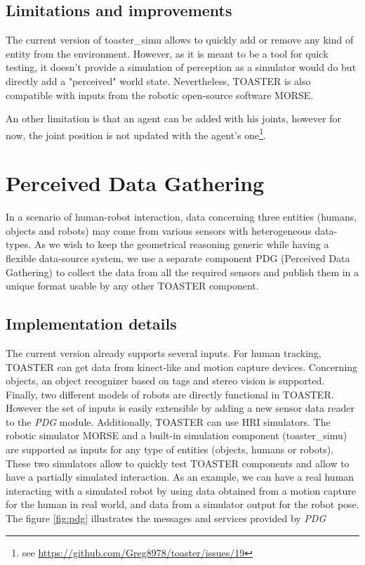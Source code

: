 \documentclass[a4paper]{article}
\begin{document}
\subsection{Limitations and improvements}
The current version of toaster\_simu allows to quickly add or remove any kind of entity from the environment. However, as it is meant to be a tool for quick testing, it doesn't provide a simulation of perception as a simulator would do but directly add a "perceived" world state. Nevertheless, TOASTER  is also compatible with inputs from the robotic open-source software MORSE.

An other limitation is that an agent can be added with his joints, however for now, the joint position is not updated with the agent's one\footnote{see \url{https://github.com/Greg8978/toaster/issues/19}}.


\section{Perceived Data Gathering}
In a scenario of human-robot interaction, data concerning three entities (humans, objects and robots) may come from various sensors with heterogeneous data-types. As we wish to keep the geometrical reasoning generic while having a flexible data-source system, we use a separate component PDG (Perceived Data Gathering) to collect the data from all the required sensors and publish them in a unique format usable by any other TOASTER component.






\subsection{Implementation details}
The current version already supports several inputs. For human tracking, TOASTER can get data from kinect-like and motion capture devices. Concerning objects, an object recognizer based on tags and stereo vision is supported. Finally, two different models of robots are directly functional in TOASTER. However the set of inputs is easily extensible by adding a new sensor data reader to the \textit{PDG} module. Additionally, TOASTER can use HRI simulators. The robotic simulator MORSE\cite{simpar_2014} \cite{lemaignan2014simulation} and a built-in simulation component (toaster\_simu) are supported as inputs for any type of entities (objects, humans or robots). These two simulators allow to quickly test TOASTER components and allow to have a partially simulated interaction. As an example, we can have a real human interacting with a simulated robot by using data obtained from a motion capture for the human in real world, and data from a simulator output for the robot pose. The figure \ref{fig:pdg} illustrates the messages and services provided by \textit{PDG}
\end{document}
